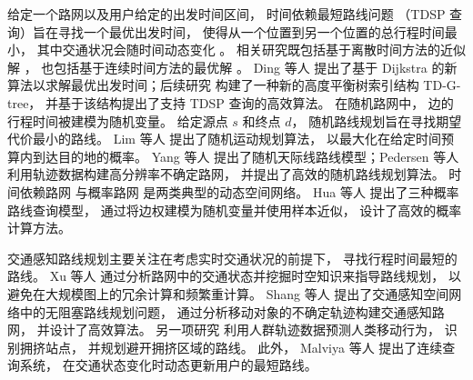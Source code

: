 给定一个路网以及用户给定的出发时间区间， 时间依赖最短路线问题 （TDSP 查询）旨在寻找一个最优出发时间， 使得从一个位置到另一个位置的总行程时间最小， 其中交通状况会随时间动态变化 。 相关研究既包括基于离散时间方法的近似解 ， 也包括基于连续时间方法的最优解 。 Ding 等人  提出了基于 Dijkstra 的新算法以求解最优出发时间；后续研究  构建了一种新的高度平衡树索引结构 TD-G-tree， 并基于该结构提出了支持 TDSP 查询的高效算法。 在随机路网中， 边的行程时间被建模为随机变量。 给定源点 $s$ 和终点 $d$， 随机路线规划旨在寻找期望代价最小的路线。 Lim 等人  提出了随机运动规划算法， 以最大化在给定时间预算内到达目的地的概率。 Yang 等人  提出了随机天际线路线模型；Pedersen 等人  利用轨迹数据构建高分辨率不确定路网， 并提出了高效的随机路线规划算法。 时间依赖路网  与概率路网  是两类典型的动态空间网络。 Hua 等人  提出了三种概率路线查询模型， 通过将边权建模为随机变量并使用样本近似， 设计了高效的概率计算方法。


交通感知路线规划主要关注在考虑实时交通状况的前提下， 寻找行程时间最短的路线。 Xu 等人  通过分析路网中的交通状态并挖掘时空知识来指导路线规划， 以避免在大规模图上的冗余计算和频繁重计算。 Shang 等人  提出了交通感知空间网络中的无阻塞路线规划问题， 通过分析移动对象的不确定轨迹构建交通感知路网， 并设计了高效算法。 另一项研究  利用人群轨迹数据预测人类移动行为， 识别拥挤站点， 并规划避开拥挤区域的路线。 此外， Malviya 等人  提出了连续查询系统， 在交通状态变化时动态更新用户的最短路线。


